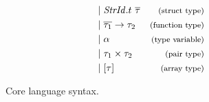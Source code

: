 \begin{figure}[htb]
\begin{align*}
\begin{aligned}
&| \; \mathit{StrId}.t \ \overline{\tau}&\footnotesize\text{(struct type)}\\
&| \; \overline{\tau_{1}} \rightarrow \tau_{2} & \footnotesize\text{(function type)}\\
&| \; \alpha                                   & \footnotesize\text{(type variable)}\\
&| \; \tau_{1} \times \tau_{2}                 & \footnotesize\text{(pair type)}\\
&| \; [\tau]                                   & \footnotesize\text{(array type)}\\
\end{aligned}
\end{align*}
\caption[Syntax: Core Language]{Core language syntax.\label{fig:CoreSyntax}}
\end{figure}

